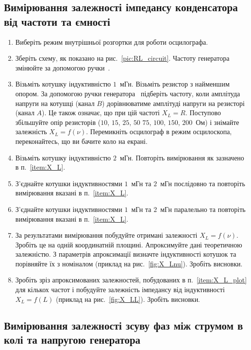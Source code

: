 \subsection*{Вимірювання залежності імпедансу конденсатора від частоти та ємності}
\begin{enumerate}
    \item Виберіть режим внутрішньої розгортки для роботи осцилографа.
    \item Зберіть схему, як показано на рис.~\ref{pic:RL_circuit}. Частоту генератора  змінюйте за допомогою ручки~\circled{\ref{btn:Hz}}.
    \item \label{item:X_L} Візьміть котушку індуктивністю $1$~мГн. Візьміть резистор з найменшим опором. За допомогою ручки генератора~\circled{\ref{btn:Hz}} підберіть частоту, коли амплітуда напруги на котушці (канал $B$) дорівнюватиме амплітуді напруги на резисторі (канал $A$). Це також означає, що при цій частоті $X_L = R$. Поступово збільшуйте опір резисторів ($10$, $15$, $25$, $50$ $75$, $100$, $150$, $200$~Ом) і знімайте залежність $X_L = f(\nu)$. Перемикніть осцилограф в режим осцилоскопа, переконайтесь, що ви бачите коло на екрані.
    \item  Візьміть котушку індуктивністю $2$~мГн. Повторіть вимірювання як зазначено в п.~\ref{item:X_L}.
    \item  З'єднайте котушки індуктивностями $1$~мГн та $2$~мГн послідовно та повторіть вимірювання вказані в п.~\ref{item:X_L}.
    \item  З'єднайте котушки індуктивностями $1$~мГн та $2$~мГн паралельно та повторіть вимірювання вказані в п.~\ref{item:X_L}.
    \item \label{item:X_L_plot}За результатами вимірювання побудуйте отримані залежності $X_L = f(\nu)$. Зробіть це на одній координатній площині. Апроксимуйте дані теоретичною залежністю. З параметрів апроксимації визначте індуктивності котушок та порівняйте їх з номіналом (приклад на рис.~\ref{fig:X_Lnu}). Зробіть висновки.
    \item Зробіть зріз апроксимованих залежностей, побудованих в п.~\ref{item:X_L_plot} для кількох частот і побудуйте залежність імпедансу від індуктивності $X_L = f(L)$ (приклад на рис.~\ref{fig:X_LL}). Зробіть висновки.
\end{enumerate}

\subsection*{Вимірювання залежності зсуву фаз між струмом в колі та напругою генератора}

